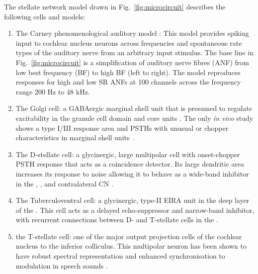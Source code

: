   The stellate network model drawn in
Fig.~\ref{fig:microcircuit} describes the following cells and models:
\begin{enumerate}
\item The Carney phenomenological auditory model
  \citet{ZilanyBruceEtAl:2009}: This model provides spiking input to
  cochlear nucleus neurons across frequencies and spontaneous rate
  types of the auditory nerve from an arbitrary input stimulus. The
  base line in Fig.~\ref{fig:microcircuit} is a simplification of
  auditory nerve fibres (ANF) from low best frequency (BF) to high BF
  (left to right). The model reproduces responses for high and low SR
  ANFs at 100 channels across the frequency range 200 Hz to 48 kHz.
\item The Golgi cell: a GABAergic \VCN marginal shell unit that is presumed to
  regulate excitability in the granule cell domain and core \VCN units
  \citep{FerragamoGoldingEtAl:1998}. The only \textit{in vivo} study shows a type
  I/III response area and PSTHs with unusual or chopper characteristics in
  marginal shell units~\citep{GhoshalKim:1997}.
\item The D-stellate cell: a glycinergic, large multipolar cell with
  onset-chopper PSTH response that acts as a coincidence detector. Its
  large dendritic area increases its response to noise allowing it to
  behave as a wide-band inhibitor in the \VCN, \DCN, and contralateral CN 
  \citep{SmithMassieEtAl:2005,ArnottWallaceEtAl:2004,NeedhamPaolini:2007}.
\item The Tuberculoventral cell: a glycinergic, type-II EIRA unit in the deep
  layer of the \DCN \citep{SpirouDavisEtAl:1999}.  This cell acts as a delayed
  echo-suppressor and narrow-band inhibitor, with recurrent connections between
  D- and T-stellate cells in the \VCN
  \citep{Alibardi:2006,OertelWickesberg:1993,WickesbergWhitlonEtAl:1991}.
\item the T-stellate cell: one of the major output projection cells of the
  cochlear nucleus to the inferior colliculus. This multipolar neuron has been
  shown to have robust spectral representation and enhanced synchronisation to
  modulation in speech sounds
  \citep{BlackburnSachs:1990,KeilsonRichardsEtAl:1997}.
\end{enumerate}

